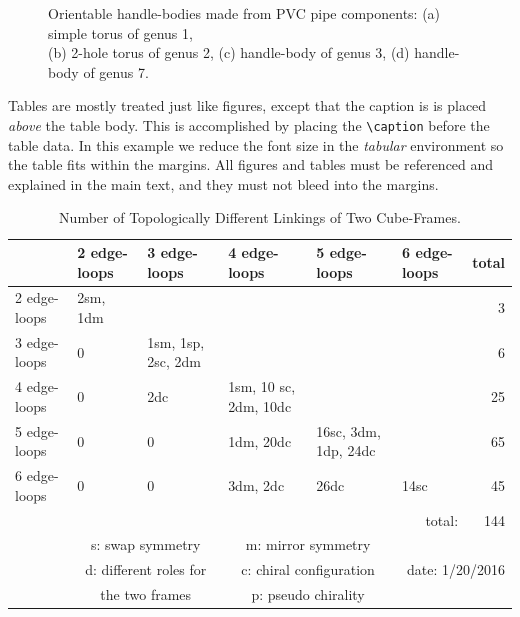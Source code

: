 \documentclass[letterpaper,11pt]{article}
\begin{document}
\begin{figure}[h!tbp]
\begin{minipage}[b]{0.2\textwidth}
        	\subcaption{} %
        	\label{fig:2d}
\end{minipage}
\caption{Orientable handle-bodies made from PVC pipe components:  (a) simple torus of genus 1, \\
(b) 2-hole torus of genus 2,  (c) handle-body of genus 3,  (d) handle-body of genus 7.}
\label{fig:2}
\end{figure}


Tables are mostly treated just like figures, except that the caption is 
is placed \emph{above} the table body. This is accomplished by placing the 
\verb|\caption| before the table data. In this example we reduce the font size 
in the \emph{tabular} environment so the table fits within the margins. 
All figures and tables must be referenced and explained in the main text, and they must
not bleed into the margins.

\begin{table}[h!tbp]
\centering
\caption{Number of Topologically Different Linkings of Two Cube-Frames.}
{\footnotesize %
\begin{tabular}{|l|l|l|l|l|l|r|}
\hline
  & 2 edge-loops & 3 edge-loops & 4 edge-loops & 5 edge-loops & 6 edge-loops & total \\
\hline
2 edge-loops & 2sm, 1dm & & & & & 3  \\
\hline
3 edge-loops & 0 & 1sm, 1sp, 2sc, 2dm & & & & 6 \\
\hline
4 edge-loops & 0 & 2dc & 1sm, 10 sc, 2dm, 10dc & & & 25\\  
\hline
5 edge-loops & 0 & 0 & 1dm, 20dc & 16sc, 3dm, 1dp, 24dc & & 65  \\  
\hline
6 edge-loops & 0 & 0 &  3dm, 2dc & 26dc & 14sc & 45\\  
\hline
 & & & & & \multicolumn{1}{r|}{total:} & 144\\
 \hline
 & \multicolumn{2}{c|}{s: swap symmetry} & \multicolumn{2}{c|}{m: mirror symmetry} & & \\
 \hline
 & \multicolumn{2}{c|}{d: different roles for} & \multicolumn{2}{c|}{c: chiral configuration} & \multicolumn{2}{r|}{date: 1/20/2016}   \\
 \hline
 & \multicolumn{2}{c|}{the two frames} & \multicolumn{2}{c|}{p: pseudo chirality} & & \\
 \hline
\end{tabular}
}
\end{table}
\end{document}
